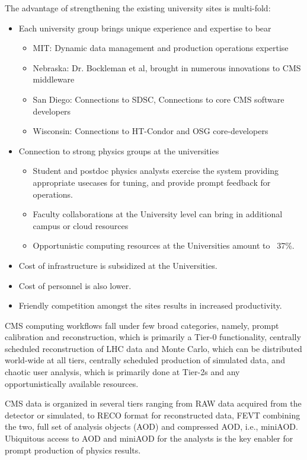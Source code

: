 \documentclass[11pt,a4paper]{article}
\begin{document}
The advantage of strengthening the existing university sites is multi-fold:
\begin{itemize}
\item Each university group brings unique experience and expertise to bear
\begin{itemize}
\item MIT: Dynamic data management and production operations expertise
\item Nebraska: Dr. Bockleman et al, brought in numerous innovations to CMS middleware
\item San Diego: Connections to SDSC, Connections to core CMS software developers
\item Wisconsin: Connections to HT-Condor and OSG core-developers
\end{itemize}
\item Connection to strong physics groups at the universities
\begin{itemize}
\item Student and postdoc physics analysts exercise the system providing
appropriate usecases for tuning, and provide prompt feedback for operations.
\item Faculty collaborations at the University level can bring in additional
campus or cloud resources
\item Opportunistic computing resources at the Universities amount to ~37\%.
\end{itemize}
\item Cost of infrastructure is subsidized at the Universities.
\item Cost of personnel is also lower.
\item Friendly competition amongst the sites results in increased productivity.
\end{itemize}

CMS computing workflows fall under few broad categories, namely, prompt
calibration and reconstruction, which is primarily a Tier-0 functionality, 
centrally scheduled reconstruction of LHC data and Monte Carlo, which 
can be distributed world-wide at all tiers, centrally scheduled production 
of simulated data, and chaotic user analysis, which is primarily done at 
Tier-2s and any opportunistically available resources.

CMS data is organized in several tiers ranging from RAW data acquired
from the detector or simulated, to RECO format for reconstructed data, 
FEVT combining the two, full set of analysis objects (AOD) and 
compressed AOD, i.e., miniAOD. Ubiquitous access to AOD and miniAOD 
for the analysts is the key enabler for prompt production of physics
results.
\end{document}
